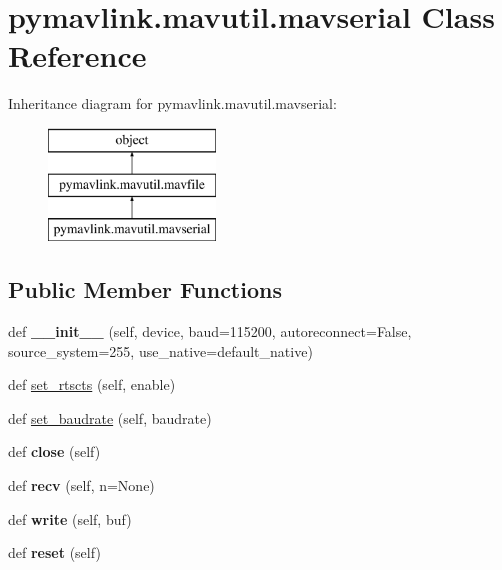 \hypertarget{classpymavlink_1_1mavutil_1_1mavserial}{}\section{pymavlink.\+mavutil.\+mavserial Class Reference}
\label{classpymavlink_1_1mavutil_1_1mavserial}
Inheritance diagram for pymavlink.\+mavutil.\+mavserial\+:\begin{figure}[H]
\begin{center}
\leavevmode
\includegraphics[height=3.000000cm]{classpymavlink_1_1mavutil_1_1mavserial}
\end{center}
\end{figure}
\subsection*{Public Member Functions}
\begin{DoxyCompactItemize}
\item 
\mbox{\label{classpymavlink_1_1mavutil_1_1mavserial_a9e4bc3a4ba1da8359ac29fac2d8df56b}} 
def {\bfseries \+\_\+\+\_\+init\+\_\+\+\_\+} (self, device, baud=115200, autoreconnect=False, source\+\_\+system=255, use\+\_\+native=default\+\_\+native)
\item 
def \hyperlink{classpymavlink_1_1mavutil_1_1mavserial_af4a1da9b197ebf58110e26b805af1fda}{set\+\_\+rtscts} (self, enable)
\item 
def \hyperlink{classpymavlink_1_1mavutil_1_1mavserial_aa69a31cb7e3cee07ec43174501cb79ac}{set\+\_\+baudrate} (self, baudrate)
\item 
\mbox{\label{classpymavlink_1_1mavutil_1_1mavserial_a3e2176f72a1c7590584597cb63d12eb2}} 
def {\bfseries close} (self)
\item 
\mbox{\label{classpymavlink_1_1mavutil_1_1mavserial_acd3d12828b5794091b0984d65c292770}} 
def {\bfseries recv} (self, n=None)
\item 
\mbox{\label{classpymavlink_1_1mavutil_1_1mavserial_a6d0072efcfa0a49f95de45a8475b26e8}} 
def {\bfseries write} (self, buf)
\item 
\mbox{\label{classpymavlink_1_1mavutil_1_1mavserial_a0ab2dd40a877e6d0e4bf8f9232805fb9}} 
def {\bfseries reset} (self)
\end{DoxyCompactItemize}
